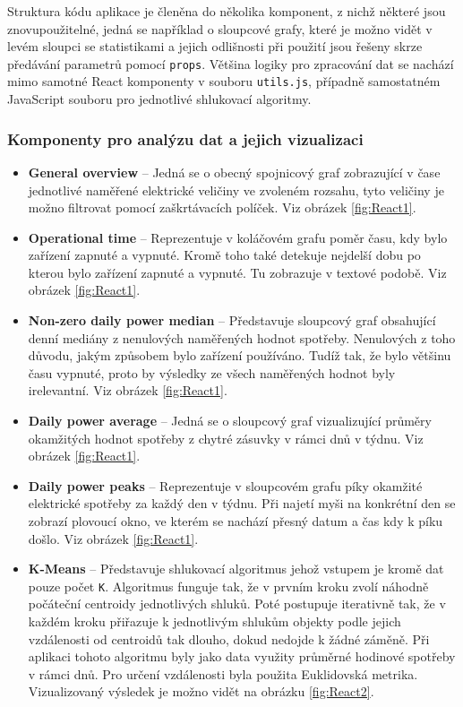\documentclass[czech,master,dept460,male,cpp,cpdeclaration,oneside]{diploma}
\begin{document}
Struktura kódu aplikace je členěna do několika komponent, z nichž některé jsou znovupoužitelné, jedná se například o sloupcové grafy, které je možno vidět v levém sloupci se statistikami a jejich odlišnosti při použití jsou řešeny skrze předávání parametrů pomocí \texttt{props}. Většina logiky pro zpracování dat se nachází mimo samotné React komponenty v souboru \texttt{utils.js}, případně samostatném JavaScript souboru pro jednotlivé shlukovací algoritmy.

\subsubsection*{Komponenty pro analýzu dat a jejich vizualizaci}
\begin{itemize}
	\item \textbf{General overview} – Jedná se o obecný spojnicový graf zobrazující v čase jednotlivé naměřené elektrické veličiny ve zvoleném rozsahu, tyto veličiny je možno filtrovat pomocí zaškrtávacích políček. Viz obrázek \ref{fig:React1}.
	\item \textbf{Operational time}	– Reprezentuje v koláčovém grafu poměr času, kdy bylo zařízení zapnuté a vypnuté. Kromě toho také detekuje nejdelší dobu po kterou bylo zařízení zapnuté a vypnuté. Tu zobrazuje v textové podobě. Viz obrázek \ref{fig:React1}.
	\item \textbf{Non-zero daily power median} – Představuje sloupcový graf obsahující denní mediány z nenulových naměřených hodnot spotřeby. Nenulových z toho důvodu, jakým způsobem bylo zařízení používáno. Tudíž tak, že bylo většinu času vypnuté, proto by výsledky ze všech naměřených hodnot byly irelevantní. Viz obrázek \ref{fig:React1}.
	\item \textbf{Daily power average} – Jedná se o sloupcový graf vizualizující průměry okamžitých hodnot spotřeby z chytré zásuvky v rámci dnů v týdnu. Viz obrázek \ref{fig:React1}.
	\item \textbf{Daily power peaks} – Reprezentuje v sloupcovém grafu píky okamžité elektrické spotřeby za každý den v týdnu. Při najetí myši na konkrétní den se zobrazí plovoucí okno, ve kterém se nachází přesný datum a čas kdy k píku došlo. Viz obrázek \ref{fig:React1}.
	\pagebreak
	\item \textbf{K-Means} – Představuje shlukovací algoritmus jehož vstupem je kromě dat pouze počet \texttt{K}. Algoritmus funguje tak, že v prvním kroku zvolí náhodně počáteční centroidy jednotlivých shluků. Poté postupuje iterativně tak, že v každém kroku přiřazuje k jednotlivým shlukům objekty podle jejich vzdálenosti od centroidů tak dlouho, dokud nedojde k žádné záměně. Při aplikaci tohoto algoritmu byly jako data využity průměrné hodinové spotřeby v rámci dnů. Pro určení vzdálenosti byla použita Euklidovská metrika. Vizualizovaný výsledek je možno vidět na obrázku \ref{fig:React2}.

\end{itemize}
\end{document}
